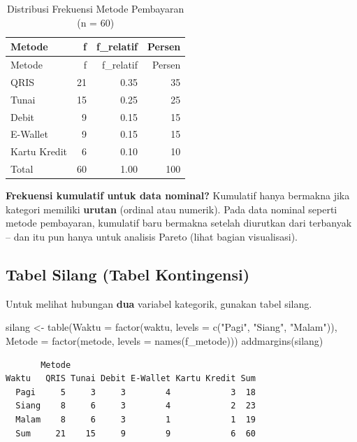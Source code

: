\documentclass[
  indonesian,
  letterpaper,
]{book}
\newenvironment{Shaded}{\begin{snugshade}}{\end{snugshade}}
\newcommand{\AttributeTok}[1]{\textcolor[rgb]{0.40,0.45,0.13}{#1}}
\newcommand{\FunctionTok}[1]{\textcolor[rgb]{0.28,0.35,0.67}{#1}}
\newcommand{\NormalTok}[1]{\textcolor[rgb]{0.00,0.23,0.31}{#1}}
\newcommand{\OtherTok}[1]{\textcolor[rgb]{0.00,0.23,0.31}{#1}}
\newcommand{\StringTok}[1]{\textcolor[rgb]{0.13,0.47,0.30}{#1}}
\begin{document}
\begin{longtable}[]{@{}lrrr@{}}
\caption{Distribusi Frekuensi Metode Pembayaran (n = 60)}\tabularnewline
\toprule\noalign{}
Metode & f & f\_relatif & Persen \\
\midrule\noalign{}
\endfirsthead
\toprule\noalign{}
Metode & f & f\_relatif & Persen \\
\midrule\noalign{}
\endhead
\bottomrule\noalign{}
\endlastfoot
QRIS & 21 & 0.35 & 35 \\
Tunai & 15 & 0.25 & 25 \\
Debit & 9 & 0.15 & 15 \\
E-Wallet & 9 & 0.15 & 15 \\
Kartu Kredit & 6 & 0.10 & 10 \\
Total & 60 & 1.00 & 100 \\
\end{longtable}

\textbf{Frekuensi kumulatif untuk data nominal?} Kumulatif hanya
bermakna jika kategori memiliki \textbf{urutan} (ordinal atau numerik).
Pada data nominal seperti metode pembayaran, kumulatif baru bermakna
setelah diurutkan dari terbanyak -- dan itu pun hanya untuk analisis
Pareto (lihat bagian visualisasi).

\subsection{Tabel Silang (Tabel
Kontingensi)}\label{tabel-silang-tabel-kontingensi}

Untuk melihat hubungan \textbf{dua} variabel kategorik, gunakan tabel
silang.

\begin{Shaded}
\begin{Highlighting}[]
\NormalTok{silang }\OtherTok{\textless{}{-}} \FunctionTok{table}\NormalTok{(}\AttributeTok{Waktu =} \FunctionTok{factor}\NormalTok{(waktu, }\AttributeTok{levels =} \FunctionTok{c}\NormalTok{(}\StringTok{"Pagi"}\NormalTok{, }\StringTok{"Siang"}\NormalTok{, }\StringTok{"Malam"}\NormalTok{)),}
\AttributeTok{Metode =} \FunctionTok{factor}\NormalTok{(metode, }\AttributeTok{levels =} \FunctionTok{names}\NormalTok{(f\_metode)))}
\FunctionTok{addmargins}\NormalTok{(silang)}
\end{Highlighting}
\end{Shaded}

\begin{verbatim}
       Metode
Waktu   QRIS Tunai Debit E-Wallet Kartu Kredit Sum
  Pagi     5     3     3        4            3  18
  Siang    8     6     3        4            2  23
  Malam    8     6     3        1            1  19
  Sum     21    15     9        9            6  60
\end{verbatim}
\end{document}
